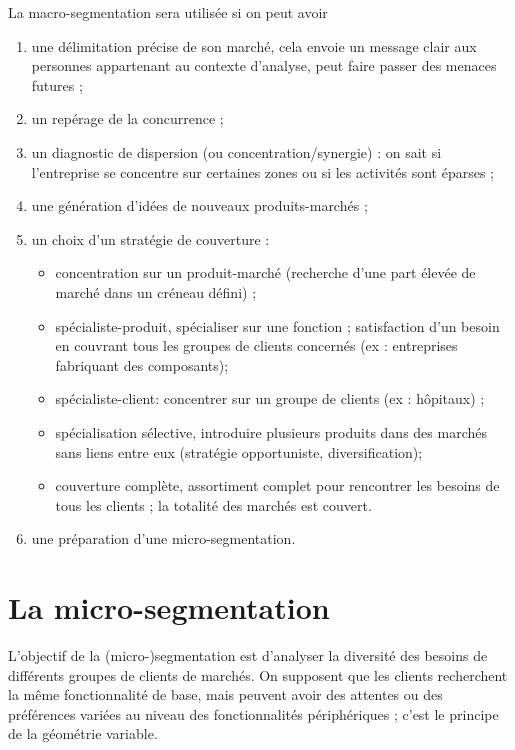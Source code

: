 		La macro-segmentation sera utilisée si on peut avoir
		\begin{enumerate}
			\item une délimitation précise de son marché, cela envoie un message clair aux personnes appartenant au contexte d'analyse, peut faire passer des menaces futures ;
			\item un repérage de la concurrence ;
			\item un diagnostic de dispersion (ou concentration/synergie) : on sait si l'entreprise se concentre sur certaines zones ou si les activités sont éparses ;
			\item une génération d'idées de nouveaux produits-marchés ;
			\item un choix d'un stratégie de couverture :
			
			\begin{itemize}
				\item concentration sur un produit-marché (recherche d'une part élevée de marché dans un créneau défini) ;
				\item spécialiste-produit, spécialiser sur une fonction ; satisfaction d'un besoin en couvrant tous les groupes de clients concernés (ex : entreprises fabriquant des composants);
				\item spécialiste-client:  concentrer sur un groupe de clients (ex : hôpitaux) ;
				\item spécialisation sélective, introduire plusieurs produits dans des marchés sans liens entre eux (stratégie opportuniste, diversification);
				\item couverture complète, assortiment complet pour rencontrer les besoins de tous les clients ; la totalité des marchés est couvert.
			\end{itemize}			
			
			\item une préparation d'une micro-segmentation.
		\end{enumerate}
		
		
	
	\section{La micro-segmentation}
	

	L'objectif de la (micro-)segmentation est d'analyser la diversité des besoins de différents groupes de clients de marchés. On supposent que les clients recherchent la même fonctionnalité de base, mais peuvent avoir des attentes ou des préférences variées au niveau des fonctionnalités périphériques ; c'est le principe de la géométrie variable. \\
		

